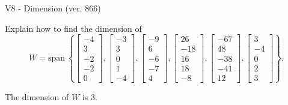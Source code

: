 \begin{exercise}
  \begin{exerciseTitle}V8 - Dimension (ver. 866)\end{exerciseTitle}
  \begin{exerciseStatement}
    Explain how to find the dimension of 
\[W=\mathrm{span}\ \left\{\left[\begin{array}{r}
-4 \\
3 \\
-2 \\
-2 \\
0
\end{array}\right] , \left[\begin{array}{r}
-3 \\
3 \\
0 \\
1 \\
-4
\end{array}\right] , \left[\begin{array}{r}
-9 \\
6 \\
-6 \\
-7 \\
4
\end{array}\right] , \left[\begin{array}{r}
26 \\
-18 \\
16 \\
18 \\
-8
\end{array}\right] , \left[\begin{array}{r}
-67 \\
48 \\
-38 \\
-41 \\
12
\end{array}\right] , \left[\begin{array}{r}
3 \\
-4 \\
0 \\
2 \\
3
\end{array}\right]\right\}.\]



  \end{exerciseStatement}
  \begin{exerciseAnswer}
   The dimension of \(W\) is  \(3\).
  


  \end{exerciseAnswer}
\end{exercise}